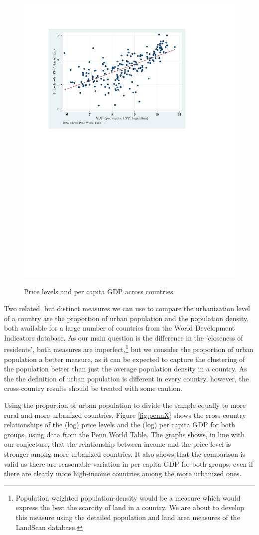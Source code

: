 \documentclass[12pt]{article}
\begin{document}
\begin{figure}[h!]
\centering
  \includegraphics[width=0.7\linewidth]{figures/sc_penn_joint}\\
  \caption{Price levels and per capita GDP across countries}\label{fig:penn_joint}
\end{figure}

Two related, but distinct measures we can use to compare the
urbanization level of a country are the proportion of urban
population and the population density, both available for a large
number of countries from the World Development Indicators database.
As our main question is the difference in the 'closeness of
residents', both measures are imperfect,\footnote{Population
weighted population-density would be a measure which would express
the best the scarcity of land in a country. We are about to develop
this measure using the detailed population and land area measures of
the LandScan database.} but we consider the proportion of urban
population a better measure, as it can be expected to capture the
clustering of the population better than just the average population
density in a country. As the the definition of urban population is
different in every country, however, the cross-country results
should be treated with some caution.

Using the proportion of urban population to divide the sample
equally to more rural and more urbanized countries, Figure
\ref{fig:pennX} shows the cross-country relationships of the (log) price levels
and the (log) per capita GDP for both groups, using data from the
Penn World Table. The graphs shows, in line with our conjecture,
that the relationship between income and the price level is stronger
among more urbanized countries. It also shows that the comparison is
valid as there are reasonable variation in per capita GDP for both
groups, even if there are clearly more high-income countries among
the more urbanized ones.
\end{document}
